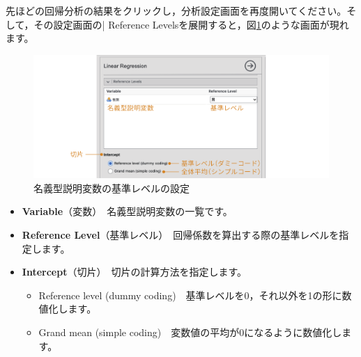 \documentclass[
  12pt,
  a5jpaper,
  lualatex, ja=standard]{bxjsbook}
\providecommand{\tightlist}{%
  \setlength{\itemsep}{0pt}\setlength{\parskip}{0pt}}
\newenvironment{jmvsettings}{%
	\begin{center}%
	\begin{tcolorbox}[%
		title=設定項目,
		colframe=gmoji,
		colbacktitle=gmoji,
		colback=gmoji!2!white,
		breakable,
		width=.9\textwidth,
		]\small\addtolength{\leftmargini}{-3\labelsep}%
	}%
	{\end{tcolorbox}\end{center}}
\begin{document}
先ほどの回帰分析の結果をクリックし，分析設定画面を再度開いてください。そして，その設定画面の\colorbox{bar}{\textcolor{gmoji2}{| Reference Levels}}を展開すると，図\ref{fig:regression-lr-reference-levels-setting}のような画面が現れます。

\begin{figure}[!ht]

{\centering \includegraphics[width=1\linewidth]{images/regression/lr-reference-levels-setting} 

}

\caption{名義型説明変数の基準レベルの設定}\label{fig:regression-lr-reference-levels-setting}
\end{figure}

\begin{jmvsettings}

\begin{itemize}
\tightlist
\item
  \textbf{Variable}（変数）　名義型説明変数の一覧です。
\item
  \textbf{Reference Level}（基準レベル）　回帰係数を算出する際の基準レベルを指定します。
\item
  \textbf{Intercept}（切片）　切片の計算方法を指定します。

  \begin{itemize}
  \tightlist
  \item
    Reference level (dummy coding)　基準レベルを0，それ以外を1の形に数値化します。
  \item
    Grand mean (simple coding)　変数値の平均が0になるように数値化します。
  \end{itemize}
\end{itemize}

\end{jmvsettings}
\end{document}
